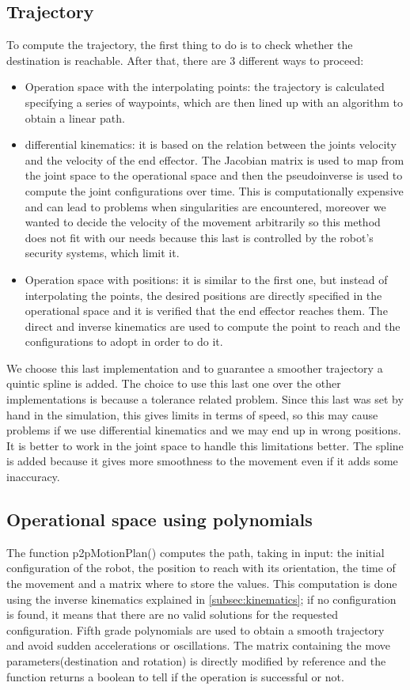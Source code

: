 \documentclass[12pt,a4paper]{article}
\begin{document}
\subsection{Trajectory}\label{subsec:trajectory}
To compute the trajectory, the first thing to do is to check whether the destination is reachable. After that, there are 3 different ways to proceed:
\begin{itemize}
    \item Operation space with the interpolating points: the trajectory is calculated specifying a series of waypoints, which are then lined up with an algorithm to obtain a linear path.
    \item differential kinematics: it is based on the relation between the joints velocity and the velocity of the end effector. The Jacobian matrix is used to map from the joint space to the operational space and then the pseudoinverse is used to compute the joint configurations over time. This is computationally expensive and can lead to problems when singularities are encountered, moreover we wanted to decide the velocity of the movement arbitrarily so this method does not fit with our needs because this last is controlled by the robot's security systems, which limit it.
    \item Operation space with positions: it is similar to the first one, but instead of interpolating the points, the desired positions are directly specified in the operational space and it is verified that the end effector reaches them. The direct and inverse kinematics are used to compute the point to reach and the configurations to adopt in order to do it. 
\end{itemize}    
We choose this last implementation and to guarantee a smoother trajectory a quintic spline is added. The choice to use this last one over the other implementations is because a tolerance related problem. Since this last was set by hand in the simulation, this gives limits in terms of speed, so this may cause problems if we use differential kinematics and we may end up in wrong positions. It is better to work in the joint space to handle this limitations better. The spline is added because it gives more smoothness to the movement even if it adds some inaccuracy.

\subsection{Operational space using polynomials}\label{subsec:opspace}
The function p2pMotionPlan() computes the path, taking in input: the initial configuration of the robot, the position to reach with its orientation, the time of the movement and a matrix where to store the values. This computation is done using the inverse kinematics explained in \ref{subsec:kinematics}; if no configuration is found, it means that there are no valid solutions for the requested configuration. Fifth grade polynomials are used to obtain a smooth trajectory and avoid sudden accelerations or oscillations. The matrix containing the move parameters(destination and rotation) is directly modified by reference and the function returns a boolean to tell if the operation is successful or not.
\end{document}
